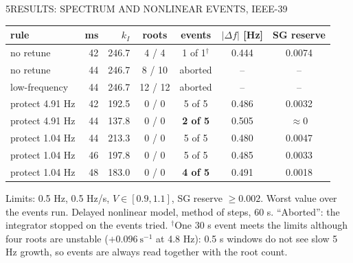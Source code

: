 \begin{minipage}[t][\PosterMiddleRowHeight][t]{\PosterHalfWidth}\vspace{0pt}
  \begin{PosterPanel}{\PosterMiddleRowHeight}{5}{RESULTS: SPECTRUM AND NONLINEAR EVENTS, IEEE-39}

    \begin{center}\fontsize{26pt}{33pt}\selectfont
    \begin{tabular}{@{}lrrcccc@{}}
    \textbf{rule} & \textbf{ms} & \textbf{$k_I$} & \textbf{roots} & \textbf{events} & \textbf{$|\Delta f|$ [Hz]} & \textbf{SG reserve}\\\hline
    no retune        & 42 & 246.7 & 4 / 4   & 1 of 1$^{\dagger}$ & 0.444 & 0.0074\\
    no retune        & 44 & 246.7 & 8 / 10  & aborted & -- & --\\
    low-frequency    & 44 & 246.7 & 12 / 12 & aborted & -- & --\\
    protect 4.91 Hz  & 42 & 192.5 & 0 / 0   & 5 of 5 & 0.486 & 0.0032\\
    protect 4.91 Hz  & 44 & 137.8 & 0 / 0   & \textbf{2 of 5} & 0.505 & $\approx0$\\
    protect 1.04 Hz  & 44 & 213.3 & 0 / 0   & 5 of 5 & 0.480 & 0.0047\\
    protect 1.04 Hz  & 46 & 197.8 & 0 / 0   & 5 of 5 & 0.485 & 0.0033\\
    protect 1.04 Hz  & 48 & 183.0 & 0 / 0   & \textbf{4 of 5} & 0.491 & 0.0018\\
    \end{tabular}\end{center}
    \vspace{1mm}
    {\fontsize{22.5pt}{25.5pt}\selectfont Limits: 0.5 Hz, 0.5 Hz/s, $V\in[0.9,1.1]$, SG reserve $\ge0.002$. Worst value over the events run. Delayed nonlinear model, method of steps, 60 s. ``Aborted'': the integrator stopped on the events tried. $^{\dagger}$One 30 s event meets the limits although four roots are unstable ($+0.096\ \mathrm{s^{-1}}$ at 4.8 Hz): 0.5 s windows do not see slow 5 Hz growth, so events are always read together with the root count.\par}

  \end{PosterPanel}
\end{minipage}%
